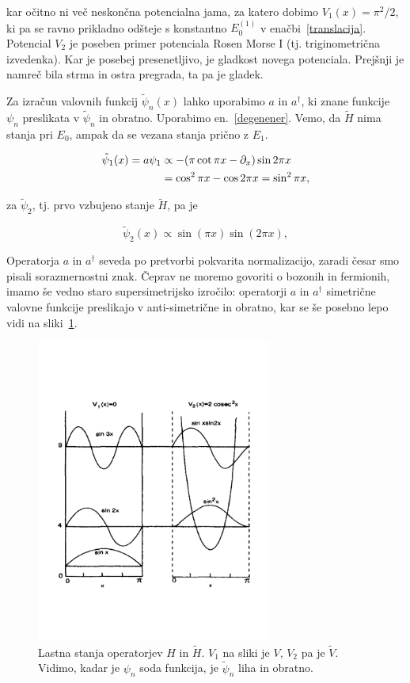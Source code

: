 \ni kar o\v citno ni ve\v c neskon\v cna potencialna jama, za katero dobimo $V_1(x) = \pi^2/2$, ki pa se ravno
prikladno od\v steje s konstantno $E_0^{(1)}$ v ena\v cbi~\eqref{translacija}. Potencial $V_2$ je poseben primer
potenciala Rosen Morse I (tj. triginometri\v cna izvedenka). Kar je posebej presenetljivo, je gladkost novega potenciala.
Prej\v snji je namre\v c bila strma in ostra pregrada, ta pa je gladek.

Za izra\v cun valovnih funkcij $\tilde{\psi}_n(x)$ lahko uporabimo $a$ in $a^\dagger$, ki znane funkcije $\psi_n$
preslikata v $\tilde{\psi}_n$ in obratno. Uporabimo en.~\eqref{degenener}.
Vemo, da $\tilde{H}$ nima stanja pri $E_0$, ampak da se vezana stanja pri\v cno z $E_1$.

\begin{align}
	\tilde{\psi}_1 (x) = a\psi_1 &\propto -(\pi \cot \pi x - \partial_x)\sin2\pi x \\
	&= \cos^2\pi x - \cos 2\pi x = \sin^2\pi x,
\end{align}

za $\tilde{\psi}_2$, tj. prvo vzbujeno stanje $\tilde{H}$, pa je

\begin{equation}
	\tilde{\psi}_2(x) \propto \sin (\pi x) \sin (2\pi x),
\end{equation}

\ni Operatorja $a$ in $a^\dagger$ seveda po pretvorbi pokvarita normalizacijo, zaradi \v cesar smo pisali sorazmernostni
znak. \v Ceprav ne moremo govoriti o bozonih in fermionih, imamo \v se vedno staro supersimetrijsko izro\v cilo:
operatorji $a$ in $a^\dagger$ simetri\v cne valovne funkcije preslikajo v anti-simetri\v cne in obratno, kar se \v se posebno
lepo vidi na sliki~\ref{sl1}.

\begin{figure}[H]
	\centering
	\includegraphics[height=10cm, keepaspectratio=1, trim=0cm 5cm 0cm 5cm]{pics/slika1}
	\caption{Lastna stanja operatorjev $H$ in $\tilde{H}$. $V_1$ na sliki je $V$, $V_2$ pa je $\tilde{V}$. Vidimo, kadar
		je $\psi_n$ soda funkcija, je $\tilde{\psi}_n$ liha in obratno.}
	\label{sl1}
\end{figure}

